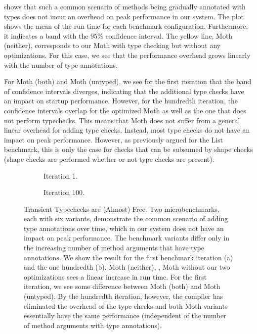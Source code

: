  shows that such a common scenario of methods being
gradually annotated with types
does not incur an overhead on peak performance in our system.
The plot shows the mean of the run time for each benchmark configuration.
Furthermore, it indicates a band with the 95\% confidence interval.
The yellow line, Moth (neither), corresponds to our Moth with type checking
but without any optimizations.
For this case, we see that the performance overhead grows
linearly with the number of type annotations.

For Moth (both) and Moth (untyped), we see for the first iteration that
the band of confidence intervals diverges, indicating that the additional type
checks have an impact on startup performance.
However, for the hundredth iteration, the confidence intervals overlap
for the optimized Moth as well as the one that does not perform typechecks.
This means that Moth does not suffer from
a general linear overhead for adding type checks.
Instead, most type checks do not have an impact on peak performance.
However, as previously argued for the List benchmark,
this is only the case for checks that can be subsumed by shape checks
(shape checks are performed whether or not type checks are present).

\begin{figure}
  \begin{subfigure}[t]{0.5\textwidth}
    \centering
    \TypeCostFirstIt{}
    \caption{Iteration 1.}
  \end{subfigure}\hfill
  \begin{subfigure}[t]{0.5\textwidth}
    \centering
    \TypeCostLastIt{}
    \caption{Iteration 100.}
  \end{subfigure}

  \caption{Transient Typechecks are (Almost) Free.
    Two microbenchmarks, each with six variants, demonstrate the common scenario
    of adding type annotations over time, which in our system does not have an impact on peak performance.
    The benchmark variants differ only in the increasing number
    of method arguments that have type annotations.
    We show the result for the first benchmark iteration (a) and the
    one hundredth (b).
    Moth (neither), \ie, Moth without our two optimizations sees a linear increase in run time.
    For the first iteration, we see some difference between Moth (both) and Moth (untyped).
    By the hundredth iteration, however, the compiler has eliminated
    the overhead of the type checks
    and both Moth variants essentially have the same performance
    (independent of the number of method arguments with type annotations).}
	\label{fig:type-cost-micro}
\end{figure}

